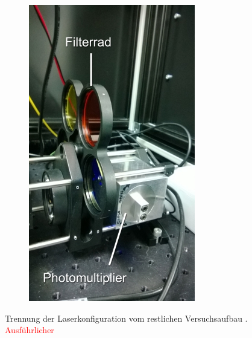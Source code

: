 \begin{figure}
\begin{subfigure}[b]{0.5\linewidth}
\end{subfigure}
\begin{subfigure}[b]{0.5\linewidth}
\includegraphics[width=0.98\linewidth]{IMAGE/pmt.png}\label{fig:pmt}
\end{subfigure}

\caption{Trennung der Laserkonfiguration vom restlichen Versuchsaufbau \cite{Anleitung}. \textcolor{red}{Ausführlicher}}
\end{figure}
\clearpage

